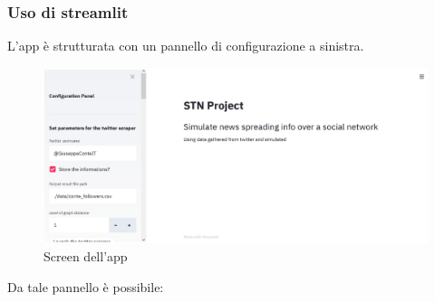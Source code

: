         \subsubsection{Uso di streamlit}
          L'app è strutturata con un pannello di configurazione a sinistra.
          \begin{figure}[H]
              \includegraphics[width=16cm]{resources/panelApp.png}
              \caption{Screen dell'app}
          \end{figure}
          Da tale pannello è possibile:
